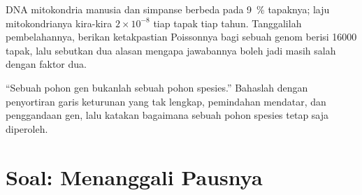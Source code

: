 \begin{exercise}[$\star\star\star$]\label{exo:b2:phylogenetic-trees:11}
DNA mitokondria manusia dan simpanse berbeda pada \qty{9}{\%}
tapaknya; laju mitokondrianya kira-kira $2\times 10^{-8}$ tiap tapak
tiap tahun. Tanggalilah pembelahannya, berikan ketakpastian Poissonnya
bagi sebuah genom berisi \qty{16000}{} tapak, lalu sebutkan dua alasan
mengapa jawabannya boleh jadi masih salah dengan faktor dua.
\end{exercise}

\begin{exercise}[$\star\star\star$]\label{exo:b2:phylogenetic-trees:12}
``Sebuah pohon gen bukanlah sebuah pohon spesies.'' Bahaslah dengan
penyortiran garis keturunan yang tak lengkap, pemindahan mendatar, dan
penggandaan gen, lalu katakan bagaimana sebuah pohon spesies tetap saja
diperoleh.
\end{exercise}

\section{Soal: Menanggali Pausnya}

